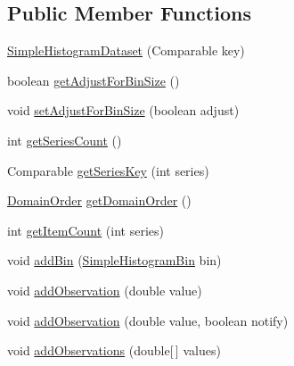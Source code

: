 \subsection*{Public Member Functions}
\begin{DoxyCompactItemize}
\item 
\mbox{\hyperlink{classorg_1_1jfree_1_1data_1_1statistics_1_1_simple_histogram_dataset_ae571e1e6a2928b504d4b0bdaeca21718}{Simple\+Histogram\+Dataset}} (Comparable key)
\item 
boolean \mbox{\hyperlink{classorg_1_1jfree_1_1data_1_1statistics_1_1_simple_histogram_dataset_a09695f11377643bfcc614305251d5d03}{get\+Adjust\+For\+Bin\+Size}} ()
\item 
void \mbox{\hyperlink{classorg_1_1jfree_1_1data_1_1statistics_1_1_simple_histogram_dataset_a8aa70f131654d3aa392cc0e90b89ed14}{set\+Adjust\+For\+Bin\+Size}} (boolean adjust)
\item 
int \mbox{\hyperlink{classorg_1_1jfree_1_1data_1_1statistics_1_1_simple_histogram_dataset_a4f4d6c0886bbc904405036f4a32d57cd}{get\+Series\+Count}} ()
\item 
Comparable \mbox{\hyperlink{classorg_1_1jfree_1_1data_1_1statistics_1_1_simple_histogram_dataset_a62448090b52d9426a4c770c5471f41df}{get\+Series\+Key}} (int series)
\item 
\mbox{\hyperlink{classorg_1_1jfree_1_1data_1_1_domain_order}{Domain\+Order}} \mbox{\hyperlink{classorg_1_1jfree_1_1data_1_1statistics_1_1_simple_histogram_dataset_a5f4f64559cabfd40b1879e5ab9402399}{get\+Domain\+Order}} ()
\item 
int \mbox{\hyperlink{classorg_1_1jfree_1_1data_1_1statistics_1_1_simple_histogram_dataset_a3de03f4cbb147a93230850fce30da30f}{get\+Item\+Count}} (int series)
\item 
void \mbox{\hyperlink{classorg_1_1jfree_1_1data_1_1statistics_1_1_simple_histogram_dataset_ab06acc1a7e2ca892026bfa3f0228e407}{add\+Bin}} (\mbox{\hyperlink{classorg_1_1jfree_1_1data_1_1statistics_1_1_simple_histogram_bin}{Simple\+Histogram\+Bin}} bin)
\item 
void \mbox{\hyperlink{classorg_1_1jfree_1_1data_1_1statistics_1_1_simple_histogram_dataset_a8a79398240a231d6b15ef632a4e74ff7}{add\+Observation}} (double value)
\item 
void \mbox{\hyperlink{classorg_1_1jfree_1_1data_1_1statistics_1_1_simple_histogram_dataset_adf7f5a92447afd39dc0852a15d4f67d5}{add\+Observation}} (double value, boolean notify)
\item 
void \mbox{\hyperlink{classorg_1_1jfree_1_1data_1_1statistics_1_1_simple_histogram_dataset_a5b67a66e2df8bdb7e808c52ff7e051df}{add\+Observations}} (double\mbox{[}$\,$\mbox{]} values)

\end{DoxyCompactItemize}
